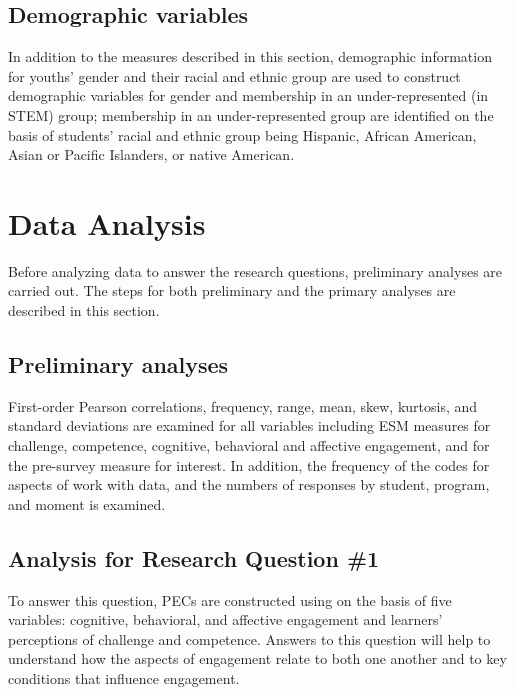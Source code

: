 \documentclass[]{book}
\theoremstyle{definition}
\theoremstyle{definition}
\theoremstyle{definition}
\theoremstyle{remark}
\begin{document}
\subsection{Demographic variables}\label{demographic-variables}

In addition to the measures described in this section, demographic
information for youths' gender and their racial and ethnic group are
used to construct demographic variables for gender and membership in an
under-represented (in STEM) group; membership in an under-represented
group are identified on the basis of students' racial and ethnic group
being Hispanic, African American, Asian or Pacific Islanders, or native
American.

\section{Data Analysis}\label{data-analysis}

Before analyzing data to answer the research questions, preliminary
analyses are carried out. The steps for both preliminary and the primary
analyses are described in this section.

\subsection{Preliminary analyses}\label{preliminary-analyses}

First-order Pearson correlations, frequency, range, mean, skew,
kurtosis, and standard deviations are examined for all variables
including ESM measures for challenge, competence, cognitive, behavioral
and affective engagement, and for the pre-survey measure for interest.
In addition, the frequency of the codes for aspects of work with data,
and the numbers of responses by student, program, and moment is
examined.

\subsection{Analysis for Research Question
\#1}\label{analysis-for-research-question-1}

To answer this question, PECs are constructed using on the basis of five
variables: cognitive, behavioral, and affective engagement and learners'
perceptions of challenge and competence. Answers to this question will
help to understand how the aspects of engagement relate to both one
another and to key conditions that influence engagement.
\end{document}
